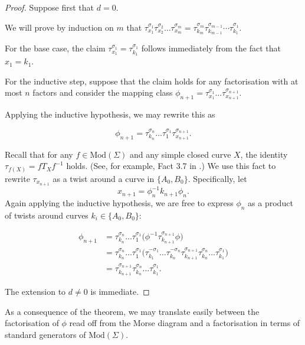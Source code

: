\documentclass{amsart}
\theoremstyle{definition}
\begin{document}
\begin{proof}
    Suppose first that $d=0$.

    We will prove by induction on $m$ that $\tau_{x_1}^{\sigma_1} \tau_{x_2}^{\sigma_2}\dots \tau_{x_m}^{\sigma_m}=\tau^{\sigma_m}_{k_{m}}\tau^{\sigma_{m-1}}_{k_{m-1}}\cdots\tau^{\sigma_1}_{k_{1}}$.

For the base case, the claim $\tau_{x_1}^{\sigma_1}=\tau_{k_1}^{\sigma_1}$ follows immediately from the fact that $x_1=k_1$.

For the inductive step, suppose that the claim holds for any factorisation with at most $n$ factors and consider the mapping class $\phi_{n+1}=\tau_{x_1}^{\sigma_1}\dots\tau_{x_{n+1}}^{\sigma_{n+1}}$.

Applying the inductive hypothesis, we may rewrite this as

\[\phi_{n+1}=\tau_{k_n}^{\sigma_n}\dots\tau_1^{\sigma_1}\tau_{x_{n+1}}^{\sigma_{n+1}}.\]

Recall that for any $f \in \text{Mod}(\Sigma)$ and any simple closed curve $X$, the identity $\tau_{f(X)}=fT_Xf^{-1}$ holds.  (See, for example, Fact 3.7 in \cite{FM}.) We use this fact to rewrite $\tau_{x_{n+1}}$ as a twist around a curve in $\{A_0, B_0\}$.  Specifically, let 
\[x_{n+1}=\phi_n^{-1}k_{n+1}\phi_n.\] Again applying the inductive hypothesis, we are free to express $\phi_n$ as a product of twists around curves $k_i\in \{A_0, B_0\}$:

\begin{align}\phi_{n+1}&=\tau_{k_n}^{\sigma_n}\dots\tau_1^{\sigma_1}\big(\phi^{-1}\tau_{k_{n+1}}^{\sigma_{n+1}}\phi\big)\\ 
&=\tau_{k_n}^{\sigma_n}\dots\tau_1^{\sigma_1}\big(\tau_{k_1}^{-\sigma_1}\dots \tau_{k_n}^{-\sigma_n}\tau_{k_{n+1}}^{\sigma_{n+1}}\tau_{k_n}^{\sigma_n}\dots \tau_{k_1}^{\sigma_1}\big)\\ 
&=\tau_{k_{n+1}}^{\sigma_{n+1}}\tau_{k_n}^{\sigma_n}\dots \tau_{k_1}^{\sigma_1}.
\end{align}


The extension to $d\neq 0$ is immediate.

 \end{proof}

 As a consequence of the theorem, we may translate easily between the factorisation of $\phi$ read off from the Morse diagram and a factorisation in terms of standard generators of $\text{Mod}(\Sigma)$.
\end{document}
